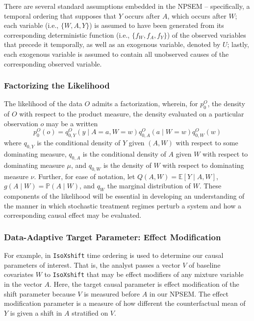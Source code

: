\documentclass[
]{article}
\begin{document}
There are several standard assumptions embedded in the NPSEM --
specifically, a temporal ordering that supposes that \(Y\) occurs after
\(A\), which occurs after \(W\); each variable (i.e., \(\{W, A, Y\}\))
is assumed to have been generated from its corresponding deterministic
function (i.e., \(\{f_W, f_A, f_Y\}\)) of the observed variables that
precede it temporally, as well as an exogenous variable, denoted by
\(U\); lastly, each exogenous variable is assumed to contain all
unobserved causes of the corresponding observed variable.

\hypertarget{factorizing-the-likelihood}{%
\subsubsection{Factorizing the
Likelihood}\label{factorizing-the-likelihood}}

The likelihood of the data \(O\) admits a factorization, wherein, for
\(p_0^O\), the density of \(O\) with respect to the product measure, the
density evaluated on a particular observation \(o\) may be a written
\begin{equation}
  p_0^O(o) = q^O_{0,Y}(y \mid A = a, W = w) q^O_{0,A}(a \mid W = w)
  q^O_{0,W}(w)
\end{equation} where \(q_{0, Y}\) is the conditional density of \(Y\)
given \((A, W)\) with respect to some dominating measure, \(q_{0, A}\)
is the conditional density of \(A\) given \(W\) with respect to
dominating measure \(\mu\), and \(q_{0, W}\) is the density of \(W\)
with respect to dominating measure \(\nu\). Further, for ease of
notation, let \(Q(A, W) = \mathbb{E}[Y \mid A, W]\),
\(g(A \mid W) = \mathbb{P}(A \mid W)\), and \(q_W\) the marginal
distribution of \(W\). These components of the likelihood will be
essential in developing an understanding of the manner in which
stochastic treatment regimes perturb a system and how a corresponding
causal effect may be evaluated.

\hypertarget{data-adaptive-target-parameter-effect-modification}{%
\subsubsection{Data-Adaptive Target Parameter: Effect
Modification}\label{data-adaptive-target-parameter-effect-modification}}

For example, in \texttt{IsoXshift} time ordering is used to determine
our causal parameters of interest. That is, the analyst passes a vector
\(V\) of baseline covariates \(W\) to \texttt{IsoXshift} that may be
effect modifiers of any mixture variable in the vector \(A\). Here, the
target causal parameter is effect modification of the shift parameter
because \(V\) is measured before \(A\) in our NPSEM. The effect
modification parameter is a measure of how different the counterfactual
mean of \(Y\) is given a shift in \(A\) stratified on \(V\).
\end{document}
